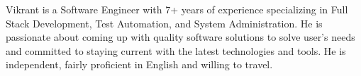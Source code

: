 

\begin{cvparagraph}

Vikrant is a Software Engineer with 7+ years of experience specializing in Full Stack Development, Test Automation, and System Administration. He is passionate about coming up with quality software solutions to solve user's needs and committed to staying current with the latest technologies and tools. He is independent, fairly proficient in English and willing to travel.
\end{cvparagraph}
